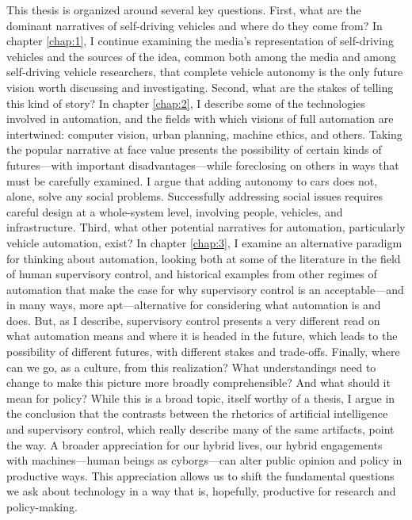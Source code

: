 This thesis is organized around several key questions. First, what are
the dominant narratives of self-driving vehicles and where do they
come from? In chapter \ref{chap:1}, I continue examining
the media's representation of self-driving vehicles and
the sources of the idea, common both among the media and among
self-driving vehicle researchers, that complete vehicle autonomy is
the only future vision worth discussing and investigating. Second,
what are the stakes of telling this kind of story? In chapter
\ref{chap:2}, I describe some of the technologies involved in
automation, and the fields with which visions of full automation are
intertwined: computer vision, urban planning, machine ethics, and
others. Taking the popular narrative at face value presents the
possibility of certain kinds of futures---with important
disadvantages---while foreclosing on others in ways that must be
carefully examined. I argue that adding autonomy to cars does not,
alone, solve any social problems. Successfully addressing social
issues requires careful design at a whole-system level, involving
people, vehicles, and infrastructure. Third, what other potential
narratives for automation,
particularly vehicle automation, exist? In chapter \ref{chap:3}, I
examine an alternative paradigm for thinking about automation, looking
both at some of the literature in the field of human supervisory
control, and historical examples from other regimes of automation that
make the case for why supervisory control is an acceptable---and in
many ways, more apt---alternative for considering what automation is
and does. But, as I describe, supervisory control presents a very
different read on what automation means and where it is headed in the
future, which leads to the possibility of different futures, with
different stakes and trade-offs. Finally, where can we go, as a
culture, from this realization? What understandings need to change to
make this picture more broadly comprehensible? And what should it mean
for policy? While this is a broad topic, itself worthy of a thesis, I
argue in the conclusion that the contrasts
between the rhetorics of artificial intelligence and supervisory
control, which really describe many of the same artifacts, point the
way. A broader appreciation for our hybrid lives, our hybrid
engagements with machines---human beings as cyborgs---can alter public
opinion and policy in
productive ways. This appreciation allows us to shift the fundamental
questions we ask about technology in a way that is, hopefully,
productive for research and policy-making.

